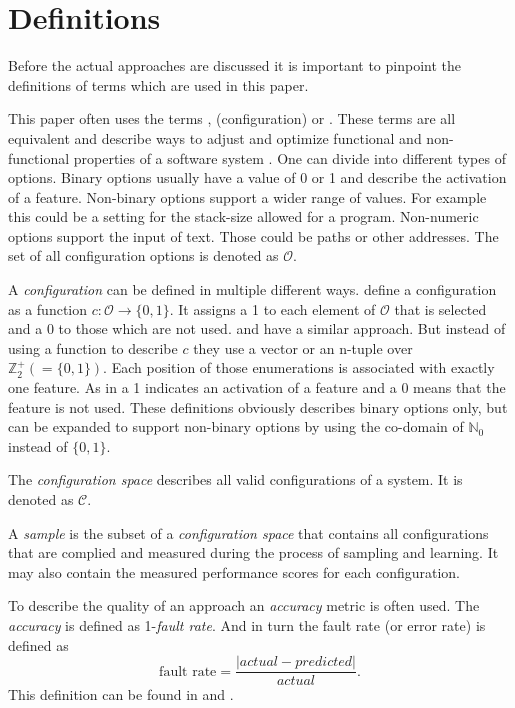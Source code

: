 \section{Definitions}

Before the actual approaches are discussed it is important to pinpoint the definitions of terms which are used in this paper.

This paper often uses the terms , (configuration)  or . These terms are all equivalent and describe ways to adjust and optimize functional and non-functional properties of a software system \cite{DistanceBasedSampling2019}.
One can divide into different types of options. Binary options usually have a value of 0 or 1 and describe the activation of a feature. Non-binary options support a wider range of values. For example this could be a setting for the stack-size allowed for a program. Non-numeric options support the input of text. Those could be paths or other addresses.
The set of all configuration options is denoted as $\mathcal{O}$.

A \textit{configuration} can be defined in multiple different ways. \citet{DistanceBasedSampling2019} define a configuration as a function $c : \mathcal{O} \rightarrow \{0,1\}$. It assigns a 1 to each element of $\mathcal{O}$ that is selected and a 0 to those which are not used. \citet{VariabilityAwarePerformancePredictionJianmeiSigmundApel} and
\citet{FasterDiscoveryofFasterSystemConfigurationsSiegmund2017} have a similar approach. But instead of using a function to describe $c$ they use a vector or an n-tuple over $\mathbb{Z}^+_2(= \{0,1\})$. Each position of those enumerations is associated with exactly one feature. As in \citet{DistanceBasedSampling2019} a 1 indicates an activation of a feature and a 0 means that the feature is not used. These definitions obviously describes binary options only, but can be expanded to support non-binary options by using the co-domain of $\mathbb{N}_0$ instead of $\{0,1\}$.

The \textit{configuration space} describes all valid configurations of a system. It is denoted as $\mathcal{C}$.

A \textit{sample} is the subset of a \textit{configuration space} that contains all configurations that are complied and measured during the process of sampling and learning. It may also contain the measured performance scores for each configuration.

To describe the quality of an approach an \textit{accuracy} metric is often used. The \textit{accuracy} is defined as 1-\textit{fault rate}. And in turn the fault rate (or error rate) is defined as 
\begin{equation}
	\text{fault rate}= \frac{|actual-predicted|}{actual}.
\end{equation} This definition can be found in \cite{FasterDiscoveryofFasterSystemConfigurationsSiegmund2017} and \cite{AutomatedFeatureDetectionSiegmund2012}.